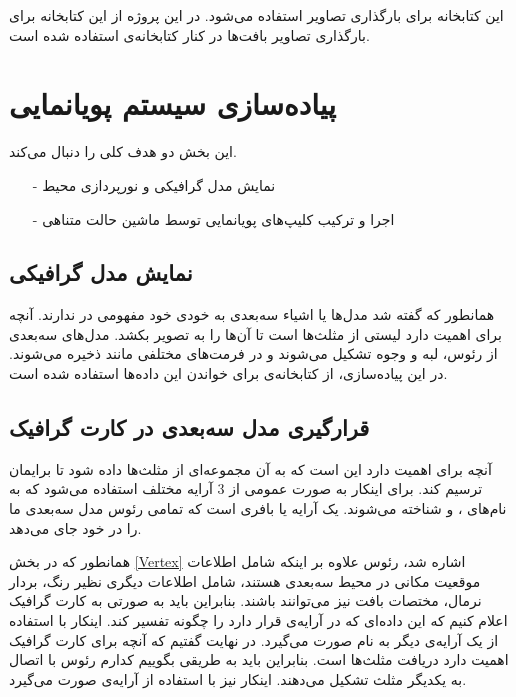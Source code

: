 این کتابخانه برای بارگذاری تصاویر استفاده می‌شود. در این پروژه از این کتابخانه برای بارگذاری
تصاویر بافت‌ها در کنار کتابخانه‌ی 
استفاده شده است.
\cite{stb}


\section{پیاده‌سازی سیستم پویانمایی}

این بخش دو هدف کلی را دنبال می‌کند.

\begin{enumerate}
	\item[-] نمایش مدل گرافیکی و نورپردازی محیط
	\item[-] اجرا و ترکیب کلیپ‌های پویانمایی توسط ماشین حالت متناهی

\end{enumerate}

\subsection{نمایش مدل گرافیکی}

همانطور که گفته شد مدل‌ها یا اشیاء سه‌بعدی به خودی خود مفهومی در 
ندارند. آنچه برای 
اهمیت دارد لیستی از مثلث‌ها است تا آن‌ها را به تصویر بکشد.
مدل‌های سه‌بعدی از رئوس، لبه و وجوه تشکیل می‌شوند و در فرمت‌های مختلفی مانند
ذخیره می‌شوند. در این پیا‌ده‌سازی، از کتابخانه‌ی 
برای خواندن این داده‌ها استفاده شده است.

\subsection{قرارگیری مدل سه‌بعدی در کارت گرافیک}

آنچه برای 
 اهمیت دارد این است که به آن مجموعه‌ای از مثلث‌ها داده شود تا برایمان ترسیم کند.
برای اینکار به صورت عمومی از 3 آرایه مختلف استفاده می‌شود که به نام‌های 
،
و 
شناخته می‌شوند.
یک آرایه یا بافری است که تمامی رئوس مدل سه‌بعدی ما را در خود جای می‌دهد.

همانطور که در بخش
\ref{Vertex}
اشاره شد، رئوس علاوه بر اینکه شامل اطلاعات موقعیت مکانی در محیط سه‌بعدی هستند، شامل اطلاعات دیگری 
نظیر رنگ، بردار نرمال، مختصات بافت نیز می‌توانند باشند. بنابراین باید به صورتی به کارت گرافیک 
اعلام کنیم که این داده‌ای که در آرایه‌ی 
قرار دارد را چگونه تفسیر کند.
اینکار با استفاده از یک آرایه‌ی دیگر به نام 
صورت می‌گیرد.
در نهایت گفتیم که آنچه برای کارت گرافیک اهمیت دارد دریافت مثلث‌ها است. بنابراین باید به طریقی بگوییم کدارم رئوس با 
اتصال به یکدیگر مثلث تشکیل می‌دهند. اینکار نیز با استفاده از آرایه‌ی 
صورت می‌گیرد.

